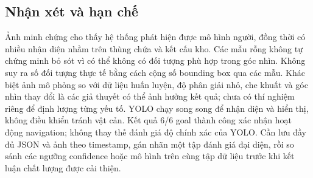 \subsection{Nhận xét và hạn chế}
Ảnh minh chứng cho thấy hệ thống phát hiện được mô hình người, đồng thời có nhiều nhận diện nhầm trên thùng chứa và kết cấu kho. Các mẫu rỗng không tự chứng minh bỏ sót vì có thể không có đối tượng phù hợp trong góc nhìn. Không suy ra số đối tượng thực tế bằng cách cộng số bounding box qua các mẫu.
Khác biệt ảnh mô phỏng so với dữ liệu huấn luyện, độ phân giải nhỏ, che khuất và góc nhìn thay đổi là các giả thuyết có thể ảnh hưởng kết quả; chưa có thí nghiệm riêng để định lượng từng yếu tố.
YOLO chạy song song để nhận diện và hiển thị, không điều khiển tránh vật cản. Kết quả 6/6 goal thành công xác nhận hoạt động navigation; không thay thế đánh giá độ chính xác của YOLO.
Cần lưu đầy đủ JSON và ảnh theo timestamp, gán nhãn một tập đánh giá đại diện, rồi so sánh các ngưỡng confidence hoặc mô hình trên cùng tập dữ liệu trước khi kết luận chất lượng được cải thiện.
